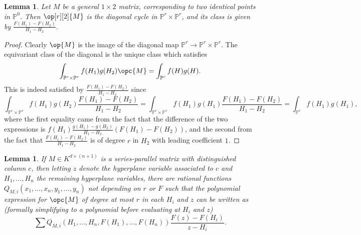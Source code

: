 \documentclass[12pt]{amsart}
\newcommand{\mb}{\mathbb}
\theoremstyle{plain}
\newtheorem{Lem}[Thm]{Lemma}
\theoremstyle{definition}
\theoremstyle{remark}
\begin{document}
\begin{Lem}\label{diagclass}
Let $M$ be a general $1\times 2$ matrix, corresponding to two identical points in $\mb{P}^0$. Then $\op[r][2]{M}$ is the diagonal cycle in $\mb{P}^r \times \mb{P}^r$, and its class is given by $\frac{F(H_1)-F(H_2)}{H_1-H_2}$.
\end{Lem}
\begin{proof}
Clearly $\op{M}$ is the image of the diagonal map $\mb{P}^r \to \mb{P}^r \times \mb{P}^r$. The equivariant class of the diagonal is the unique class which satisfies $$\int_{\mb{P}^r \times \mb{P}^r}f(H_1)g(H_2)\opc{M}= \int_{\mb{P}^r}f(H)g(H).$$ This is indeed satisfied by $\frac{F(H_1)-F(H_2)}{H_1-H_2}$ since $$\int_{\mb{P}^r \times \mb{P}^r}f(H_1)g(H_2)\frac{F(H_1)-F(H_2)}{H_1-H_2}=\int_{\mb{P}^r \times \mb{P}^r}f(H_1)g(H_1)\frac{F(H_1)-F(H_2)}{H_1-H_2}=\int_{\mb{P}^r}f(H_1)g(H_1),$$
where the first equality came from the fact that the difference of the two expressions is $f(H_1)\frac{g(H_1)-g(H_2)}{H_1-H_2}(F(H_1)-F(H_2))$, and the second from the fact that $\frac{F(H_1)-F(H_2)}{H_1-H_2}$ is of degree $r$ in $H_2$ with leading coefficient $1$.
\end{proof}

\begin{Lem}\label{serparform}
If $M \in K^{d \times (n+1)}$ is a series-parallel matrix with distinguished column $c$, then letting $z$ denote the hyperplane variable associated to $c$ and $H_1,\ldots,H_n$ the remaining hyperplane variables, there are rational functions $Q_{M,i}(x_1,\ldots, x_n,y_1,\ldots, y_n)$ not depending on $r$ or $F$ such that the polynomial expression for $\opc{M}$ of degree at most $r$ in each $H_i$ and $z$ can be written as (formally simplifying to a polynomial before evaluating at $H_i$ and $z$)
$$\sum Q_{M,i}(H_1,\ldots,H_n,F(H_1),\ldots,F(H_n))\frac{F(z)-F(H_i)}{z-H_i}.$$
\end{Lem}
\end{document}
